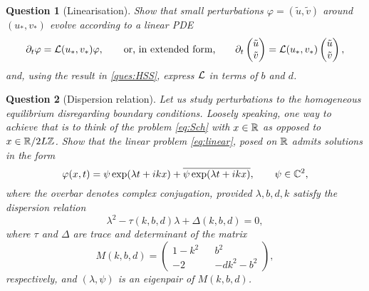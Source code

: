\documentclass[a4paper]{siamart220329}
\theoremstyle{plain}
\newtheorem{question}{Question}
\renewcommand{\phi}{\varphi}
\begin{document}
\begin{question}[Linearisation]
  Show that small perturbations $\varphi = (\tilde u, \tilde v)$ around $(u_*,v_*)$ evolve
  according to a linear PDE
  \begin{equation}\label{eq:linear}
    \partial_t \phi = \calL(u_*,v_*) \phi, 
    \qquad \text{or, in extended form,} \qquad
    \partial_t 
  \begin{pmatrix} \tilde u \\ \tilde v \end{pmatrix} 
  = \calL(u_*,v_*)
  \begin{pmatrix} \tilde u \\ \tilde v \end{pmatrix} 
  ,\end{equation} 
  and, using the result in \cref{ques:HSS}, express $\mathcal{L}$ in terms of $b$ and $d$. 
\end{question}

\begin{question}[Dispersion relation]\label{ques:eigenvals}
  Let us study perturbations to the homogeneous equilibrium disregarding
  boundary conditions. Loosely speaking, one way to achieve that is to think of the
  problem \cref{eq:Sch} with $x \in \mathbb{R}$ as opposed to $ x \in \mathbb{R}/2L\mathbb{Z}$. Show
  that the linear problem \cref{eq:linear}, posed on $\mathbb{R}$ admits solutions in the
  form 
  \[
    \phi(x,t) = \psi \exp(\lambda t + ik x) + \overline{\psi \exp(\lambda t + i k x)}, \qquad \psi \in \CSet^2,
  \] 
  where the overbar denotes complex conjugation, provided $\lambda, b, d, k$ satisfy
  the dispersion relation
  \begin{equation} \label{eq:dispersion}
    \lambda^2 - \tau(k,b,d)\lambda + \Delta(k,b,d) = 0,
  \end{equation}
  where $\tau$ and $\Delta$ are trace and determinant of the matrix
  \[
    M(k,b,d) = 
    \begin{pmatrix} 1-k^2 && b^2 \\ -2 && -dk^2 - b^2 \end{pmatrix},
  \]
  respectively, and $(\lambda,\psi)$ is an eigenpair of $M(k,b,d)$.
\end{question}
\end{document}
